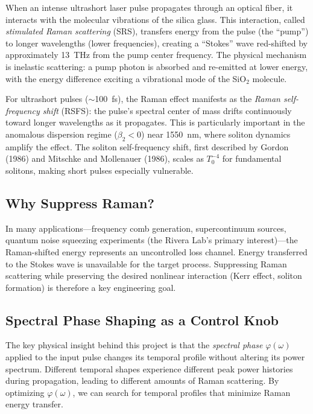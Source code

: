 \documentclass[12pt,a4paper]{article}
\theoremstyle{definition}
\begin{document}
When an intense ultrashort laser pulse propagates through an optical fiber, it interacts with the molecular vibrations of the silica glass. This interaction, called \emph{stimulated Raman scattering} (SRS), transfers energy from the pulse (the ``pump'') to longer wavelengths (lower frequencies), creating a ``Stokes'' wave red-shifted by approximately 13~THz from the pump center frequency. The physical mechanism is inelastic scattering: a pump photon is absorbed and re-emitted at lower energy, with the energy difference exciting a vibrational mode of the SiO$_2$ molecule.

For ultrashort pulses ($\sim$100~fs), the Raman effect manifests as the \emph{Raman self-frequency shift} (RSFS): the pulse's spectral center of mass drifts continuously toward longer wavelengths as it propagates. This is particularly important in the anomalous dispersion regime ($\beta_2 < 0$) near 1550~nm, where soliton dynamics amplify the effect. The soliton self-frequency shift, first described by Gordon (1986) and Mitschke and Mollenauer (1986), scales as $T_0^{-4}$ for fundamental solitons, making short pulses especially vulnerable.

\subsection{Why Suppress Raman?}

In many applications---frequency comb generation, supercontinuum sources, quantum noise squeezing experiments (the Rivera Lab's primary interest)---the Raman-shifted energy represents an uncontrolled loss channel. Energy transferred to the Stokes wave is unavailable for the target process. Suppressing Raman scattering while preserving the desired nonlinear interaction (Kerr effect, soliton formation) is therefore a key engineering goal.

\subsection{Spectral Phase Shaping as a Control Knob}

The key physical insight behind this project is that the \emph{spectral phase} $\varphi(\omega)$ applied to the input pulse changes its temporal profile without altering its power spectrum. Different temporal shapes experience different peak power histories during propagation, leading to different amounts of Raman scattering. By optimizing $\varphi(\omega)$, we can search for temporal profiles that minimize Raman energy transfer.
\end{document}
